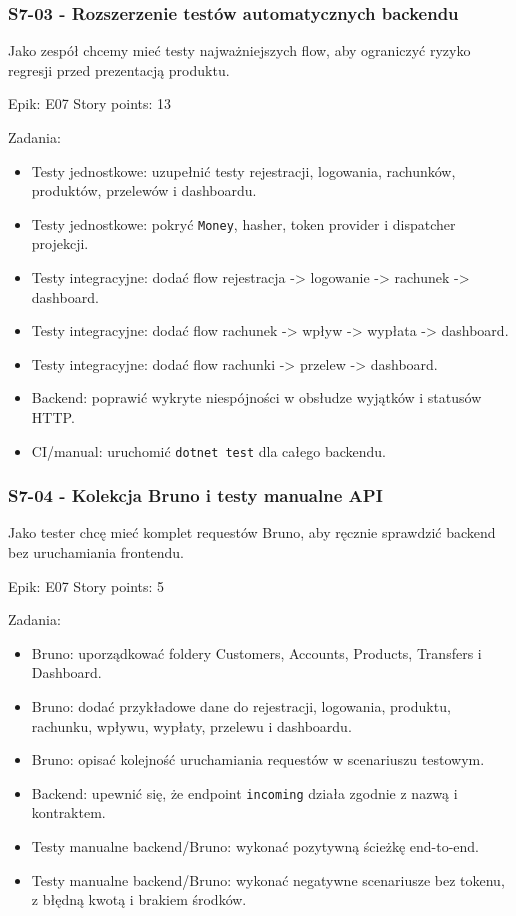 \documentclass[12pt,a4paper]{article}
\begin{document}
\subsubsection*{S7-03 - Rozszerzenie testów automatycznych backendu}

Jako zespół chcemy mieć testy najważniejszych flow, aby ograniczyć ryzyko regresji przed prezentacją produktu.

Epik: E07
Story points: 13

Zadania:

\begin{itemize}
\item Testy jednostkowe: uzupełnić testy rejestracji, logowania, rachunków, produktów, przelewów i dashboardu.
\item Testy jednostkowe: pokryć \texttt{Money}, hasher, token provider i dispatcher projekcji.
\item Testy integracyjne: dodać flow rejestracja -> logowanie -> rachunek -> dashboard.
\item Testy integracyjne: dodać flow rachunek -> wpływ -> wypłata -> dashboard.
\item Testy integracyjne: dodać flow rachunki -> przelew -> dashboard.
\item Backend: poprawić wykryte niespójności w obsłudze wyjątków i statusów HTTP.
\item CI/manual: uruchomić \texttt{dotnet test} dla całego backendu.
\end{itemize}

\subsubsection*{S7-04 - Kolekcja Bruno i testy manualne API}

Jako tester chcę mieć komplet requestów Bruno, aby ręcznie sprawdzić backend bez uruchamiania frontendu.

Epik: E07
Story points: 5

Zadania:

\begin{itemize}
\item Bruno: uporządkować foldery Customers, Accounts, Products, Transfers i Dashboard.
\item Bruno: dodać przykładowe dane do rejestracji, logowania, produktu, rachunku, wpływu, wypłaty, przelewu i dashboardu.
\item Bruno: opisać kolejność uruchamiania requestów w scenariuszu testowym.
\item Backend: upewnić się, że endpoint \texttt{incoming} działa zgodnie z nazwą i kontraktem.
\item Testy manualne backend/Bruno: wykonać pozytywną ścieżkę end-to-end.
\item Testy manualne backend/Bruno: wykonać negatywne scenariusze bez tokenu, z błędną kwotą i brakiem środków.
\end{itemize}
\end{document}

